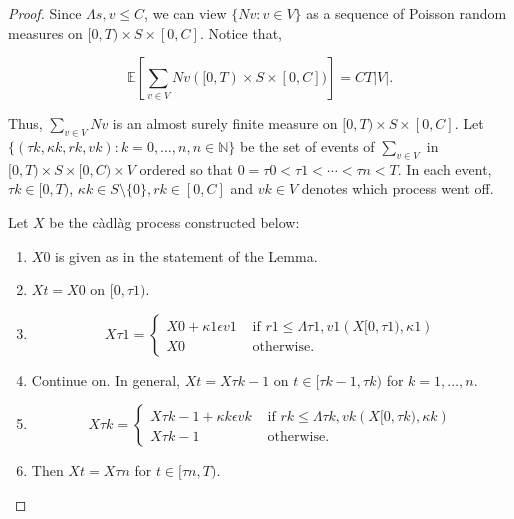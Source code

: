 \documentclass[12pt]{article}
\newcommand{\mb}{\mathbb}
\newcommand{\te}{\text}
\newcommand{\ep}{\epsilon}
\newcommand{\ind}{\hspace{24pt}}
\newcommand{\ex}[1]{\mb{E}\left[#1\right]}			%
\renewcommand{\v}{v}							%
\renewcommand{\S}{S}							%
\newcommand{\ev}{\ep}							%
\newcommand{\T}{T}								%
\renewcommand{\t}{t}							%
\renewcommand{\tt}{s}							%
\newcommand{\X}{X}								%
\newcommand{\const}{C}							%
\newcommand{\poiss}{N}							%
\renewcommand{\r}{r}							%
\newcommand{\rt}{\tau}							%
\renewcommand{\it}{k}							%
\renewcommand{\mark}{\kappa}					%
\newcommand{\ratee}{\Lambda}					%
\begin{document}
\begin{proof}
Since \(\ratee{\tt,\v} \leq \const{}\), we can view \(\{\poiss{\v}:\v\in V\}\) as a sequence of Poisson random measures on \([0,\T)\times \S\times [0,\const{}]\). Notice that,

\[\ex{\sum_{\v\in V}\poiss{\v}([0,\T)\times\S\times[0,\const{}])} = \const{}\T|V|.\]

Thus, \(\sum_{\v\in V}\poiss{\v}\) is an almost surely finite measure on \([0,\T)\times \S\times [0,\const{}]\). Let \(\{(\rt{\it},\mark{\it},\r{\it},\v{\it}):\it = 0,\dots,n, n\in \mb{N}\}\) be the set of events of \(\sum_{\v\in V}\) in \([0,\T)\times\S\times [0,\const{})\times V\) ordered so that \(0=\rt{0} < \rt{1} < \cdots < \rt{n} < \T\). In each event, \(\rt{\it} \in [0,\T)\), \(\mark{\it}\in \S\setminus\{0\}, \r{\it} \in [0,\const{}]\) and \(\v{\it} \in V\) denotes which process went off.

\ind Let \(\X{}{}\) be the c\`adl\`ag process constructed below:

\begin{enumerate}
\item \(\X{}{0}\) is given as in the statement of the Lemma.

\item \(\X{}{\t} = \X{}{0}\) on \([0,\rt{1})\).

\item 

\[\X{}{\rt{1}} = \begin{cases}
\X{}{0} + \mark{1}\ev{\v{1}} &\te{ if } \r{1} \leq \ratee{\rt{1},\v{1}}(\X{}{[0,\rt{1})},\mark{1})\\
\X{}{0} &\te{ otherwise.}
\end{cases}
\] 

\item Continue on. In general, \(\X{}{\t} = \X{}{\rt{\it-1}}\) on \(\t \in [\rt{\it-1},\rt{\it})\) for \(\it= 1,\dots,n\).

\item 

\[\X{}{\rt{\it}} = \begin{cases}
\X{}{\rt{\it-1}} + \mark{\it}\ev{\v{\it}} &\te{ if } \r{\it} \leq \ratee{\rt{\it},\v{\it}}(\X{}{[0,\rt{\it})},\mark{\it})\\
\X{}{\rt{\it-1}} &\te{ otherwise.}
\end{cases}\]

\item Then \(\X{}{\t} = \X{}{\rt{n}}\) for \(\t\in [\rt{n},\T)\).
\end{enumerate}


\end{proof}
\end{document}
